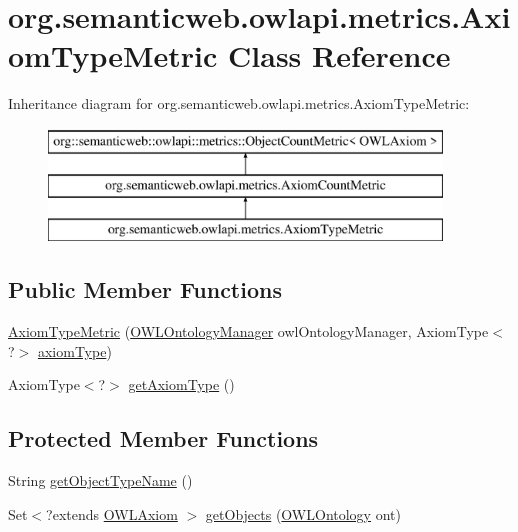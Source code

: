 \hypertarget{classorg_1_1semanticweb_1_1owlapi_1_1metrics_1_1_axiom_type_metric}{\section{org.\-semanticweb.\-owlapi.\-metrics.\-Axiom\-Type\-Metric Class Reference}
\label{classorg_1_1semanticweb_1_1owlapi_1_1metrics_1_1_axiom_type_metric}
}
Inheritance diagram for org.\-semanticweb.\-owlapi.\-metrics.\-Axiom\-Type\-Metric\-:\begin{figure}[H]
\begin{center}
\leavevmode
\includegraphics[height=3.000000cm]{classorg_1_1semanticweb_1_1owlapi_1_1metrics_1_1_axiom_type_metric}
\end{center}
\end{figure}
\subsection*{Public Member Functions}
\begin{DoxyCompactItemize}
\item 
\hyperlink{classorg_1_1semanticweb_1_1owlapi_1_1metrics_1_1_axiom_type_metric_aa241fba0a6297ce30a0cbae9d261beca}{Axiom\-Type\-Metric} (\hyperlink{interfaceorg_1_1semanticweb_1_1owlapi_1_1model_1_1_o_w_l_ontology_manager}{O\-W\-L\-Ontology\-Manager} owl\-Ontology\-Manager, Axiom\-Type$<$?$>$ \hyperlink{classorg_1_1semanticweb_1_1owlapi_1_1metrics_1_1_axiom_type_metric_af30a32e790cfcb94f3409d7ea95ed9ee}{axiom\-Type})
\item 
Axiom\-Type$<$?$>$ \hyperlink{classorg_1_1semanticweb_1_1owlapi_1_1metrics_1_1_axiom_type_metric_a1ca19c81ea5e18ce4ff3e91fe259421d}{get\-Axiom\-Type} ()
\end{DoxyCompactItemize}
\subsection*{Protected Member Functions}
\begin{DoxyCompactItemize}
\item 
String \hyperlink{classorg_1_1semanticweb_1_1owlapi_1_1metrics_1_1_axiom_type_metric_a8be76de10c2a21b9026b4d1550ca0dc7}{get\-Object\-Type\-Name} ()
\item 
Set$<$?extends \hyperlink{interfaceorg_1_1semanticweb_1_1owlapi_1_1model_1_1_o_w_l_axiom}{O\-W\-L\-Axiom} $>$ \hyperlink{classorg_1_1semanticweb_1_1owlapi_1_1metrics_1_1_axiom_type_metric_ae572dcb5bf335dc4c1f7a26702fb63e3}{get\-Objects} (\hyperlink{interfaceorg_1_1semanticweb_1_1owlapi_1_1model_1_1_o_w_l_ontology}{O\-W\-L\-Ontology} ont)
\end{DoxyCompactItemize}
